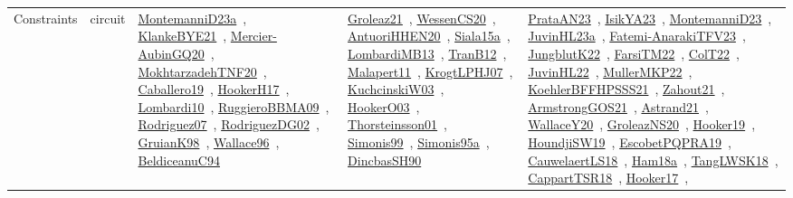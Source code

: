 {\begin{longtable}{lp{3cm}>{\raggedright\arraybackslash}p{6cm}>{\raggedright\arraybackslash}p{6cm}>{\raggedright\arraybackslash}p{8cm}}
Constraints & circuit & \href{works/MontemanniD23a.pdf}{MontemanniD23a}~\cite{MontemanniD23a}, \href{works/KlankeBYE21.pdf}{KlankeBYE21}~\cite{KlankeBYE21}, \href{works/Mercier-AubinGQ20.pdf}{Mercier-AubinGQ20}~\cite{Mercier-AubinGQ20}, \href{works/MokhtarzadehTNF20.pdf}{MokhtarzadehTNF20}~\cite{MokhtarzadehTNF20}, \href{works/Caballero19.pdf}{Caballero19}~\cite{Caballero19}, \href{works/HookerH17.pdf}{HookerH17}~\cite{HookerH17}, \href{works/Lombardi10.pdf}{Lombardi10}~\cite{Lombardi10}, \href{works/RuggieroBBMA09.pdf}{RuggieroBBMA09}~\cite{RuggieroBBMA09}, \href{works/Rodriguez07.pdf}{Rodriguez07}~\cite{Rodriguez07}, \href{works/RodriguezDG02.pdf}{RodriguezDG02}~\cite{RodriguezDG02}, \href{works/GruianK98.pdf}{GruianK98}~\cite{GruianK98}, \href{works/Wallace96.pdf}{Wallace96}~\cite{Wallace96}, \href{works/BeldiceanuC94.pdf}{BeldiceanuC94}~\cite{BeldiceanuC94} & \href{works/Groleaz21.pdf}{Groleaz21}~\cite{Groleaz21}, \href{works/WessenCS20.pdf}{WessenCS20}~\cite{WessenCS20}, \href{works/AntuoriHHEN20.pdf}{AntuoriHHEN20}~\cite{AntuoriHHEN20}, \href{works/Siala15a.pdf}{Siala15a}~\cite{Siala15a}, \href{works/LombardiMB13.pdf}{LombardiMB13}~\cite{LombardiMB13}, \href{works/TranB12.pdf}{TranB12}~\cite{TranB12}, \href{works/Malapert11.pdf}{Malapert11}~\cite{Malapert11}, \href{works/KrogtLPHJ07.pdf}{KrogtLPHJ07}~\cite{KrogtLPHJ07}, \href{works/KuchcinskiW03.pdf}{KuchcinskiW03}~\cite{KuchcinskiW03}, \href{works/HookerO03.pdf}{HookerO03}~\cite{HookerO03}, \href{works/Thorsteinsson01.pdf}{Thorsteinsson01}~\cite{Thorsteinsson01}, \href{works/Simonis99.pdf}{Simonis99}~\cite{Simonis99}, \href{works/Simonis95a.pdf}{Simonis95a}~\cite{Simonis95a}, \href{works/DincbasSH90.pdf}{DincbasSH90}~\cite{DincbasSH90} & \href{works/PrataAN23.pdf}{PrataAN23}~\cite{PrataAN23}, \href{works/IsikYA23.pdf}{IsikYA23}~\cite{IsikYA23}, \href{works/MontemanniD23.pdf}{MontemanniD23}~\cite{MontemanniD23}, \href{works/JuvinHL23a.pdf}{JuvinHL23a}~\cite{JuvinHL23a}, \href{works/Fatemi-AnarakiTFV23.pdf}{Fatemi-AnarakiTFV23}~\cite{Fatemi-AnarakiTFV23}, \href{works/JungblutK22.pdf}{JungblutK22}~\cite{JungblutK22}, \href{works/FarsiTM22.pdf}{FarsiTM22}~\cite{FarsiTM22}, \href{works/ColT22.pdf}{ColT22}~\cite{ColT22}, \href{works/JuvinHL22.pdf}{JuvinHL22}~\cite{JuvinHL22}, \href{works/MullerMKP22.pdf}{MullerMKP22}~\cite{MullerMKP22}, \href{works/KoehlerBFFHPSSS21.pdf}{KoehlerBFFHPSSS21}~\cite{KoehlerBFFHPSSS21}, \href{works/Zahout21.pdf}{Zahout21}~\cite{Zahout21}, \href{works/ArmstrongGOS21.pdf}{ArmstrongGOS21}~\cite{ArmstrongGOS21}, \href{works/Astrand21.pdf}{Astrand21}~\cite{Astrand21}, \href{works/WallaceY20.pdf}{WallaceY20}~\cite{WallaceY20}, \href{works/GroleazNS20.pdf}{GroleazNS20}~\cite{GroleazNS20}, \href{works/Hooker19.pdf}{Hooker19}~\cite{Hooker19}, \href{works/HoundjiSW19.pdf}{HoundjiSW19}~\cite{HoundjiSW19}, \href{works/EscobetPQPRA19.pdf}{EscobetPQPRA19}~\cite{EscobetPQPRA19}, \href{works/CauwelaertLS18.pdf}{CauwelaertLS18}~\cite{CauwelaertLS18}, \href{works/Ham18a.pdf}{Ham18a}~\cite{Ham18a}, \href{works/TangLWSK18.pdf}{TangLWSK18}~\cite{TangLWSK18}, \href{works/CappartTSR18.pdf}{CappartTSR18}~\cite{CappartTSR18}, \href{works/Hooker17.pdf}{Hooker17}~\cite{Hooker17}, 
\end{longtable}}
